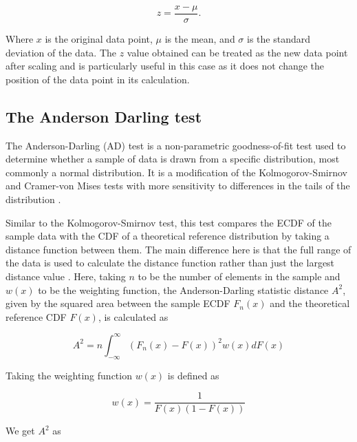 \documentclass[12pt]{article}
\begin{document}
\begin{equation}
    z = \frac{x - \mu}{\sigma}.
    \label{eq:scaling_formula}
\end{equation}

\medskip
\noindent Where $x$ is the original data point, $\mu$ is the mean, and $\sigma$ is the standard deviation of the data. The $z$ value obtained can be treated as the new data point after scaling and is particularly useful in this case as it does not change the position of the data point in its calculation.

\pagebreak
\subsection{The Anderson Darling test}\label{AndersonDarling}

The Anderson-Darling (AD) test is a non-parametric goodness-of-fit test used to determine whether a sample of data is drawn from a specific distribution, most commonly a normal distribution. It is a modification of the Kolmogorov-Smirnov and Cramer-von Mises tests with more sensitivity to differences in the tails of the distribution \cite{guthrie_nistsematech_2020, Michael_2025_statsref}.

\medskip
\noindent Similar to the Kolmogorov-Smirnov test, this test compares the ECDF of the sample data with the CDF of a theoretical reference distribution by taking a distance function between them. The main difference here is that the full range of the data is used to calculate the distance function rather than just the largest distance value \cite{Michael_2025_statsref}. Here, taking $n$ to be the number of elements in the sample and $w(x)$ to be the weighting function, the Anderson-Darling statistic distance $A^2$, given by the squared area between the sample ECDF $F_n(x)$ and the theoretical reference CDF $F(x)$, is calculated as

\begin{equation}
  A^2 = n \int_{-\infty}^{\infty} \left( F_n(x) - F(x) \right)^2 w(x) dF(x)
  \label{eq:ad_distance_function}
\end{equation}

\medskip
\noindent Taking the weighting function $w(x)$ is defined as

\begin{equation}
    w(x) = \frac{1}{F(x) (1 - F(x))}
    \label{eq:ad_weighting_function}
\end{equation}

\medskip
\noindent We get $A^2$ \cite{anderson1954test} as
\end{document}
